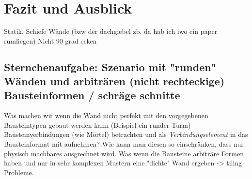 \chapter{Fazit und Ausblick}
Statik, Schiefe Wände (bzw der dachgiebel zb. da hab ich iwo ein paper rumliegen)
Nicht 90 grad ecken

\section{Sternchenaufgabe: Szenario mit "runden" Wänden und arbiträren (nicht rechteckige) Bausteinformen / schräge schnitte}
Was machen wir wenn die Wand nicht perfekt mit den vorgegebenen Bausteintypen gebaut werden kann (Beispiel ein runder Turm)
Bausteinverbindungen (wie Mörtel) betrachten und als \textit{Verbindungselement} in das Bausteinformat mit aufnehmen? Wie kann man diesen so einschränken, dass nur physisch machbares ausgrechnet wird.
Was wenn die Bausteine arbiträre Formen haben und nur in sehr komplexen Mustern eine "dichte" Wand ergeben -> tiling Probleme.
